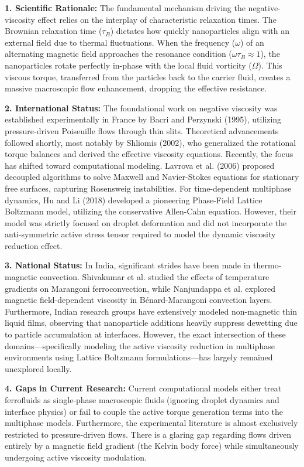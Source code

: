 \documentclass[11pt, a4paper]{article}
\begin{document}
\textbf{1. Scientific Rationale:}
The fundamental mechanism driving the negative-viscosity effect relies on the interplay of characteristic relaxation times. The Brownian relaxation time ($\tau_B$) dictates how quickly nanoparticles align with an external field due to thermal fluctuations. When the frequency ($\omega$) of an alternating magnetic field approaches the resonance condition ($\omega\tau_B \approx 1$), the nanoparticles rotate perfectly in-phase with the local fluid vorticity ($\Omega$). This viscous torque, transferred from the particles back to the carrier fluid, creates a massive macroscopic flow enhancement, dropping the effective resistance.

\textbf{2. International Status:}
The foundational work on negative viscosity was established experimentally in France by Bacri and Perzynski (1995), utilizing pressure-driven Poiseuille flows through thin slits. Theoretical advancements followed shortly, most notably by Shliomis (2002), who generalized the rotational torque balances and derived the effective viscosity equations. Recently, the focus has shifted toward computational modeling. Lavrova et al. (2006) proposed decoupled algorithms to solve Maxwell and Navier-Stokes equations for stationary free surfaces, capturing Rosensweig instabilities. For time-dependent multiphase dynamics, Hu and Li (2018) developed a pioneering Phase-Field Lattice Boltzmann model, utilizing the conservative Allen-Cahn equation. However, their model was strictly focused on droplet deformation and did not incorporate the anti-symmetric active stress tensor required to model the dynamic viscosity reduction effect.

\textbf{3. National Status:}
In India, significant strides have been made in thermo-magnetic convection. Shivakumar et al. studied the effects of temperature gradients on Marangoni ferroconvection, while Nanjundappa et al. explored magnetic field-dependent viscosity in Bénard-Marangoni convection layers. Furthermore, Indian research groups have extensively modeled non-magnetic thin liquid films, observing that nanoparticle additions heavily suppress dewetting due to particle accumulation at interfaces. However, the exact intersection of these domains—specifically modeling the active viscosity reduction in multiphase environments using Lattice Boltzmann formulations—has largely remained unexplored locally.

\textbf{4. Gaps in Current Research:}
Current computational models either treat ferrofluids as single-phase macroscopic fluids (ignoring droplet dynamics and interface physics) or fail to couple the active torque generation terms into the multiphase models. Furthermore, the experimental literature is almost exclusively restricted to pressure-driven flows. There is a glaring gap regarding flows driven entirely by a magnetic field gradient (the Kelvin body force) while simultaneously undergoing active viscosity modulation.
\end{document}

